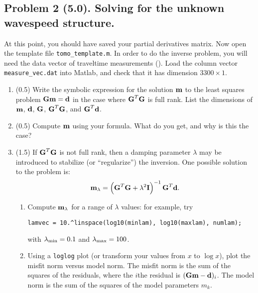 \documentclass[11pt,titlepage,fleqn]{article}
\begin{document}

\pagebreak
\subsection*{Problem 2 (5.0). Solving for the unknown wavespeed structure.}

At this point, you should have saved your partial derivatives matrix. Now open the template file \verb+tomo_template.m+. In order to do the inverse problem, you will need the data vector of traveltime measurements (). Load the column vector \verb+measure_vec.dat+ into Matlab, and check that it has dimension $3300 \times 1$.

\begin{enumerate}
\item (0.5) Write the symbolic expression for the solution $\mbox{${\bf m}$}$ to the least squares problem $\mbox{${\bf G}$}\mbox{${\bf m}$}=\mbox{${\bf d}$}$ in the case where $\mbox{${\bf G}$}^T\mbox{${\bf G}$}$ is full rank.  List the dimensions of $\mbox{${\bf m}$}$, $\mbox{${\bf d}$}$, $\mbox{${\bf G}$}$, $\mbox{${\bf G}$}^T\mbox{${\bf G}$}$, and $\mbox{${\bf G}$}^T\mbox{${\bf d}$}$.

\item (0.5) Compute $\mbox{${\bf m}$}$ using your formula.  What do you get, and why is this the case?

\item (1.5) If $\mbox{${\bf G}$}^T\mbox{${\bf G}$}$ is not full rank, then a damping parameter $\lambda$ may be introduced to stabilize (or ``regularize'') the inversion.  One possible solution to the problem is:
%
\begin{equation}
\mbox{${\bf m}$}_{\lambda} = \left(\mbox{${\bf G}$}^T\mbox{${\bf G}$}+\lambda^2\mbox{${\bf I}$}\right)^{-1}\mbox{${\bf G}$}^T\mbox{${\bf d}$}.
\end{equation}
%
\begin{enumerate}
\item Compute $\mbox{${\bf m}$}_{\lambda}$ for a range of $\lambda$ values: for example, try

\verb+lamvec = 10.^linspace(log10(minlam), log10(maxlam), numlam);+

with $\lambda_{\rm min} = 0.1$ and $\lambda_{\rm max} = 100$.

\item Using a \verb+loglog+ plot (or transform your values from $x$ to $\log x$), plot the misfit norm versus model norm. The misfit norm is the sum of the squares of the residuals, where the $i$the residual is $(\mbox{${\bf G}$}\mbox{${\bf m}$}-\mbox{${\bf d}$})_i$. The model norm is the sum of the squares of the model parameters $m_k$.
\end{enumerate}


\end{enumerate}
\end{document}

